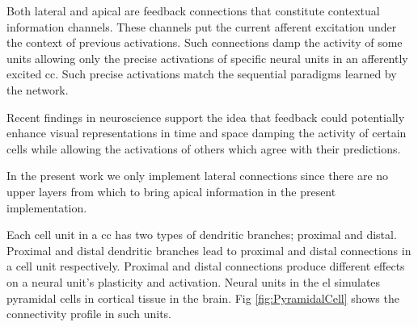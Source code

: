 \documentclass[10pt,letterpaper]{article}
\begin{document}
\pagebreak


Both lateral and apical are feedback connections that constitute contextual information channels. 
These channels put the current afferent excitation under the context of previous activations.
Such connections damp the activity of some units allowing only the precise activations
of specific neural units in an afferently excited \gls{cc}.
Such precise activations match the sequential paradigms learned by the network.

Recent findings in neuroscience \cite{Marques2018} support the idea 
that feedback could potentially enhance visual representations in time and space
damping the activity of certain cells while allowing the activations  of others
which agree with their predictions.

In the present work we only implement lateral connections since
there are no upper layers 
from which to bring apical information in the present implementation.

Each cell unit in a \gls{cc} has two types of dendritic branches; proximal and distal.
Proximal and distal dendritic branches lead to proximal and distal connections in a cell unit respectively.
Proximal and distal connections produce different effects on a neural unit's plasticity and activation.
Neural units in the \gls{el} simulates pyramidal cells in cortical tissue in the brain.
Fig \ref{fig:PyramidalCell} shows the connectivity profile in such units. 
\end{document}
